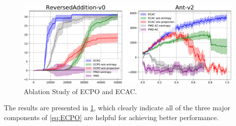 \begin{figure}[t]
\begin{center}
\includegraphics[width=0.9\linewidth]{./ablation-results.pdf}
\end{center}
\caption{Ablation Study of ECPO and ECAC. }
\label{fig:ablation}
\end{figure}

The results are presented in \cref{fig:ablation},
which clearly indicate all of the three major components of \cref{eq:ECPO}
are helpful for achieving better performance. 

